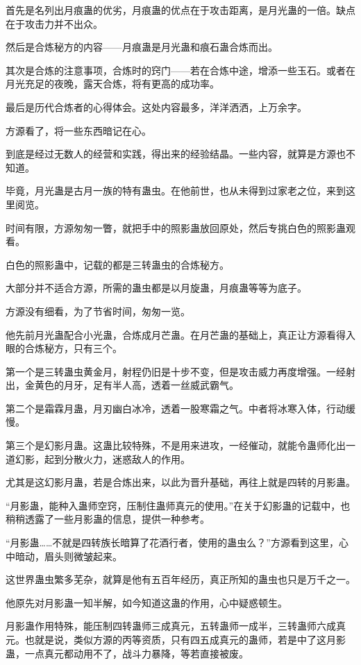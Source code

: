 \begin{this_body}
首先是名列出月痕蛊的优劣，月痕蛊的优点在于攻击距离，是月光蛊的一倍。缺点在于攻击力并不出众。

然后是合炼秘方的内容——月痕蛊是月光蛊和痕石蛊合炼而出。

其次是合炼的注意事项，合炼时的窍门——若在合炼中途，增添一些玉石。或者在月光充足的夜晚，露天合炼，将有更高的成功率。

最后是历代合炼者的心得体会。这处内容最多，洋洋洒洒，上万余字。

方源看了，将一些东西暗记在心。

到底是经过无数人的经营和实践，得出来的经验结晶。一些内容，就算是方源也不知道。

毕竟，月光蛊是古月一族的特有蛊虫。在他前世，也从未得到过家老之位，来到这里阅览。

时间有限，方源匆匆一瞥，就把手中的照影蛊放回原处，然后专挑白色的照影蛊观看。

白色的照影蛊中，记载的都是三转蛊虫的合炼秘方。

大部分并不适合方源，所需的蛊虫都是以月旋蛊，月痕蛊等等为底子。

方源没有细看，为了节省时间，匆匆一览。

他先前月光蛊配合小光蛊，合炼成月芒蛊。在月芒蛊的基础上，真正让方源看得入眼的合炼秘方，只有三个。

第一个是三转蛊虫黄金月，射程仍旧是十步不变，但是攻击威力再度增强。一经射出，金黄色的月牙，足有半人高，透着一丝威武霸气。

第二个是霜霖月蛊，月刃幽白冰冷，透着一股寒霜之气。中者将冰寒入体，行动缓慢。

第三个是幻影月蛊。这蛊比较特殊，不是用来进攻，一经催动，就能令蛊师化出一道幻影，起到分散火力，迷惑敌人的作用。

尤其是这幻影月蛊，若是合炼出来，以此为晋升基础，再往上就是四转的月影蛊。

“月影蛊，能种入蛊师空窍，压制住蛊师真元的使用。”在关于幻影蛊的记载中，也稍稍透露了一些月影蛊的信息，提供一种参考。

“月影蛊……不就是四转族长暗算了花酒行者，使用的蛊虫么？”方源看到这里，心中暗动，眉头则微皱起来。

这世界蛊虫繁多芜杂，就算是他有五百年经历，真正所知的蛊虫也只是万千之一。

他原先对月影蛊一知半解，如今知道这蛊的作用，心中疑惑顿生。

月影蛊作用特殊，能压制四转蛊师三成真元，五转蛊师一成半，三转蛊师六成真元。也就是说，类似方源的丙等资质，只有四五成真元的蛊师，若是中了这月影蛊，一点真元都动用不了，战斗力暴降，等若直接被废。


\end{this_body}
